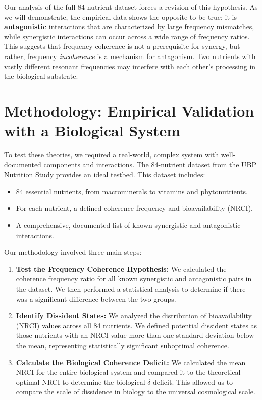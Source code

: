 \documentclass[12pt, a4paper]{article}
\begin{document}
Our analysis of the full 84-nutrient dataset forces a revision of this hypothesis. As we will demonstrate, the empirical data shows the opposite to be true: it is \textbf{antagonistic} interactions that are characterized by large frequency mismatches, while synergistic interactions can occur across a wide range of frequency ratios. This suggests that frequency coherence is not a prerequisite for synergy, but rather, frequency \textit{incoherence} is a mechanism for antagonism. Two nutrients with vastly different resonant frequencies may interfere with each other’s processing in the biological substrate.

\section{Methodology: Empirical Validation with a Biological System}

To test these theories, we required a real-world, complex system with well-documented components and interactions. The 84-nutrient dataset from the UBP Nutrition Study provides an ideal testbed. This dataset includes:

\begin{itemize}
    \item 84 essential nutrients, from macrominerals to vitamins and phytonutrients.
    \item For each nutrient, a defined coherence frequency and bioavailability (NRCI).
    \item A comprehensive, documented list of known synergistic and antagonistic interactions.
\end{itemize}

Our methodology involved three main steps:

\begin{enumerate}
    \item \textbf{Test the Frequency Coherence Hypothesis:} We calculated the coherence frequency ratio for all known synergistic and antagonistic pairs in the dataset. We then performed a statistical analysis to determine if there was a significant difference between the two groups.
    \item \textbf{Identify Dissident States:} We analyzed the distribution of bioavailability (NRCI) values across all 84 nutrients. We defined potential dissident states as those nutrients with an NRCI value more than one standard deviation below the mean, representing statistically significant suboptimal coherence.
    \item \textbf{Calculate the Biological Coherence Deficit:} We calculated the mean NRCI for the entire biological system and compared it to the theoretical optimal NRCI to determine the biological $\delta$-deficit. This allowed us to compare the scale of dissidence in biology to the universal cosmological scale.
\end{enumerate}
\end{document}
